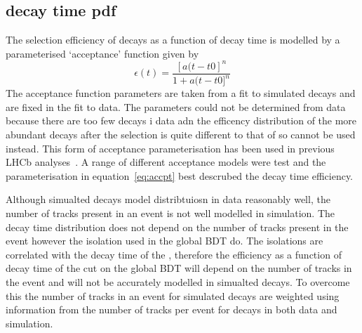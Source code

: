 \subsection{\bsmumu decay time pdf}
\label{sec:signalDTpdf}
The selection efficiency of \bsmumu decays as a function of decay time is modelled by a parameterised `acceptance' function given by
\begin{equation}
\epsilon(t) = \frac{[a(t - t{0}]^{n}}{1 + a(t - t{0}]^{n}}
\label{eq:accpt}
\end{equation}
The acceptance function parameters are taken from a fit to simulated \bsmumu decays and are fixed in the fit to data. The parameters could not be determined from data because there are too few \bsmumu decays i data adn the efficency distribution of the more abundant \bhh decays after the selection is quite different to that of \bsmumu so cannot be used instead. This form of acceptance parameterisation has been used in previous LHCb analyses~\cite{}. A range of different acceptance models were test and the parameterisation in equation~\ref{eq:accpt} best descrubed the decay time efficiency.


Although simualted decays model distribtuiosn in data reasonably well, the number of tracks present in an event is not well modelled in simulation. %
The \bs decay time distribution does not depend on the number of tracks present in the event however the isolation used in the global BDT do. The isolations are correlated with the decay time of the \bs, therefore the efficiency as a function of decay time of the cut on the global BDT will depend on the number of tracks in the event and will not be accurately modelled in simualted decays.  
To overcome this the number of tracks in an event for simulated \bsmumu decays are weighted using information from the number of tracks per event for \bdkpi decays in both data and simulation. 

